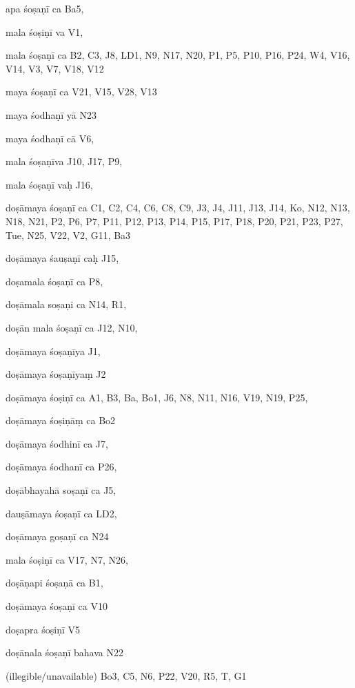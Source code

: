 \begin{marma}[hp02_009]
\begin{marma}[hp02_011]
 \begin{marma}[hp02_35c]
\item[apa śoṣaṇī ca] Ba5,
\item[mala śoṣiṇī va] V1,
\item[mala śoṣaṇī ca] B2, C3, J8, LD1, N9, N17, N20, P1, P5, P10, P16, P24, W4, V16, V14, V3, V7, V18, V12
\item[maya śoṣaṇī ca] V21, V15, V28, V13
\item[maya śodhaṇī yā] N23
\item[maya śodhaṇī cā] V6, 
\item[mala śoṣaṇīva] J10, J17, P9,
\item[mala śoṣaṇī vaḥ] J16,
\item[doṣāmaya śoṣaṇī ca] C1, C2, C4, C6, C8, C9, J3, J4, J11, J13, J14, Ko, N12, N13, N18, N21, P2, P6, P7, P11, P12, P13, P14, P15, P17, P18, P20, P21, P23, P27, Tue, N25, V22, V2, G11, Ba3
\item[doṣāmaya śauṣaṇī caḥ] J15, 
\item[doṣamala śoṣaṇī ca] P8,  
\item[doṣāmala soṣaṇi ca] N14, R1,  
\item[doṣān mala śoṣaṇī ca] J12, N10, 
\item[doṣāmaya śoṣaṇīya] J1,
\item[doṣāmaya śoṣaṇīyaṃ] J2
\item[doṣāmaya śoṣiṇī ca] A1, B3, Ba, Bo1, J6, N8, N11, N16, V19, N19, P25, 
\item[doṣāmaya śoṣiṇāṃ ca] Bo2
\item[doṣāmaya śodhinī ca] J7, 
\item[doṣāmaya śodhanī ca] P26,
\item[doṣābhayahā soṣaṇī ca] J5,
\item[dauṣāmaya śoṣaṇī ca] LD2,
\item[doṣāmaya goṣaṇī ca] N24
\item[mala śoṣiṇī ca] V17, N7, N26,
\item[doṣāṇapi śoṣaṇā ca] B1,
\item[doṣāmaya śoṣaṇī ca] V10
\item[doṣapra śoṣiṇī] V5
\item[doṣānala śoṣaṇī bahava] N22
\item[(illegible/unavailable)] Bo3, C5, N6, P22, V20, R5, T, G1
  \begin{description}

    \end{description}
 \end{marma}


\end{marma}
\end{marma}

